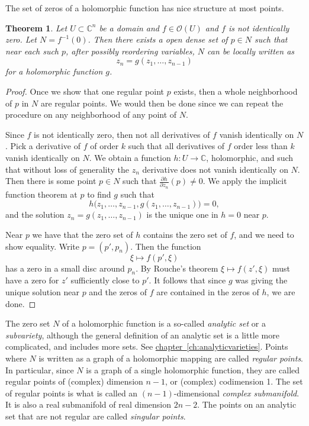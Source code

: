 \documentclass[12pt,openany]{book}
\newcommand{\C}{{\mathbb{C}}}
\newcommand{\sO}{{\mathscr{O}}}
\newcommand{\myindex}[1]{#1\index{#1}}
\theoremstyle{plain}
\newtheorem{thm}{Theorem}[section]
\theoremstyle{remark}
\theoremstyle{definition}
\theoremstyle{exercise}
\theoremstyle{example}
\newcommand{\chapterref}[1]{\hyperref[#1]{chapter~\ref*{#1}}}
\begin{document}
The set of zeros of a holomorphic function has nice structure at most
points.

\begin{thm} \label{thm:regptsdense}
Let $U \subset \C^n$ be a domain and
$f \in \sO(U)$ and $f$ is not identically zero.
Let $N = f^{-1}(0)$.  Then there exists a open dense set of $p \in N$
such that near each such $p$, after possibly reordering variables,
$N$ can be locally written as
\begin{equation*}
z_n = g(z_1,\ldots,z_{n-1})
\end{equation*}
for a holomorphic function $g$.
\end{thm}

\begin{proof}
Once we show that one regular point $p$ exists, then a whole
neighborhood of $p$ in $N$ are regular points.  We would then be done
since we can
repeat the procedure on any neighborhood of any point of $N$.

Since $f$ is not identically zero, then not all derivatives of $f$
vanish identically on $N$.  Pick a derivative of $f$ of order $k$
such that all derivatives of $f$ order less than $k$ vanish identically on $N$.
We obtain a function $h \colon U \to \C$, holomorphic, and such that 
without loss of generality the $z_n$ derivative does not vanish identically
on $N$.  Then there is some point $p \in N$ such that $\frac{\partial
h}{\partial z_n}(p) \not= 0$.
We apply the implicit function theorem at $p$ to find $g$ such that
\begin{equation*}
h\bigr(z_1,\ldots,z_{n-1},g(z_1,\ldots,z_{n-1})\bigr) = 0 ,
\end{equation*}
and the solution $z_n = g(z_1,\ldots,z_{n-1})$ is the unique one
in $h=0$ near $p$.

Near $p$ we have that the zero set of $h$ contains the zero set of $f$, and
we need to show equality.
Write $p = (p',p_n)$.  Then the function
\begin{equation*}
\xi \mapsto f(p',\xi)
\end{equation*}
has a zero in a small disc around $p_n$.  By Rouche's theorem
$\xi \mapsto f(z',\xi)$ must have a zero for $z'$ sufficiently close to $p'$.
It follows that since $g$ was giving the unique solution near $p$ and the
zeros of $f$ are contained in the zeros of $h$, we are done.
\end{proof}

The zero set $N$ of a holomorphic function is a so-called
\emph{\myindex{analytic set}} or a \emph{\myindex{subvariety}},
although the general definition of an
analytic set is a little more complicated, and includes more sets.
See \chapterref{ch:analyticvarieties}.
Points where $N$ is written as a graph of a holomorphic mapping are called
\emph{regular points}.  In particular,
since $N$ is a graph of a single holomorphic function, they are called
regular points of (complex) dimension $n-1$, or (complex) codimension 1.
The set of regular points is what is called an
$(n-1)$-dimensional \emph{\myindex{complex submanifold}}.  It is also a real
submanifold of real dimension $2n-2$.
The points on an analytic set that are not regular are called
\emph{singular points}.
\end{document}
